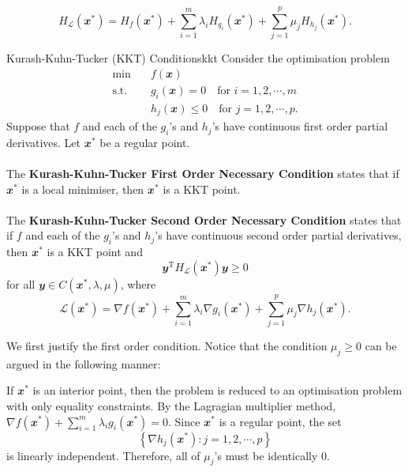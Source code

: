 \documentclass[math, code]{amznotes}
\theoremstyle{remark}
\begin{document}
\begin{equation*}
    H_{\mathcal{L}}(\mathbfit{x}^*) = H_f(\mathbfit{x}^*) + \sum_{i = 1}^{m}\lambda_i H_{g_i}(\mathbfit{x}^*) + \sum_{j = 1}^{p}\mu_jH_{h_j}(\mathbfit{x}^*).
\end{equation*}
\begin{thmbox}{Kurash-Kuhn-Tucker (KKT) Conditions}{kkt}
    Consider the optimisation problem
    \begin{align*}
        \min & \quad f(\mathbfit{x}) \\
        \mathrm{s.t.} & \quad g_i(\mathbfit{x}) = 0 \quad\textrm{for } i = 1, 2, \cdots, m \\
        & \quad h_j(\mathbfit{x}) \leq 0 \quad\textrm{for } j = 1, 2, \cdots, p.
    \end{align*}
    Suppose that $f$ and each of the $g_i$'s and $h_j$'s have continuous first order partial derivatives. Let $\mathbfit{x}^*$ be a regular point.
    \\\\
    The {\color{red} \textbf{Kurash-Kuhn-Tucker First Order Necessary Condition}} states that if $\mathbfit{x}^*$ is a local minimiser, then $\mathbfit{x}^*$ is a KKT point.
    \\\\
    The {\color{red} \textbf{Kurash-Kuhn-Tucker Second Order Necessary Condition}} states that if $f$ and each of the $g_i$'s and $h_j$'s have continuous second order partial derivatives, then $\mathbfit{x}^*$ is a KKT point and 
    \begin{equation*}
        \mathbfit{y}^{\mathrm{T}}H_{\mathcal{L}}(\mathbfit{x}^*)\mathbfit{y} \geq 0
    \end{equation*}
    for all $\mathbfit{y} \in C(\mathbfit{x}^*, \lambda, \mu)$, where
    \begin{equation*}
        \mathcal{L}(\mathbfit{x}^*) = \nabla f(\mathbfit{x}^*) + \sum_{i = 1}^{m}\lambda_i\nabla g_i(\mathbfit{x}^*) + \sum_{j = 1}^{p}\mu_j\nabla h_j(\mathbfit{x}^*).
    \end{equation*}
\end{thmbox}
We first justify the first order condition. Notice that the condition $\mu_j \geq 0$ can be argued in the following manner:

If $\mathbfit{x}^*$ is an interior point, then the problem is reduced to an optimisation problem with only equality constraints. By the Lagragian multiplier method, $\nabla f(\mathbfit{x}^*) + \sum_{i = 1}^{m}\lambda_i g_i(\mathbfit{x}^*) = \mathbfit{0}$. Since $\mathbfit{x}^*$ is a regular point, the set
\begin{displaymath}
    \left\{\nabla h_j(\mathbfit{x}^*) \colon j = 1, 2, \cdots, p\right\}
\end{displaymath}
is linearly independent. Therefore, all of $\mu_j$'s must be identically $0$.
\end{document}
